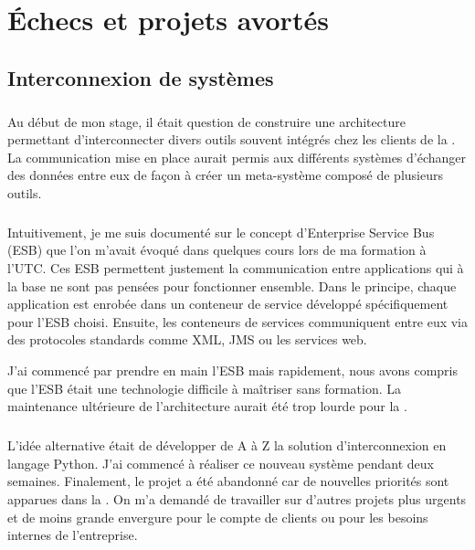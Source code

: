 \chapter{Échecs et projets avortés}
\label{section:avortes}

\section{Interconnexion de systèmes}

\paragraph{}
Au début de mon stage, il était question de construire une architecture permettant d'interconnecter divers outils souvent intégrés chez les clients de la \abusys.
La communication mise en place aurait permis aux différents systèmes d'échanger des données entre eux de façon à créer un \og meta-système \fg{} composé de plusieurs outils.

\paragraph{}
Intuitivement, je me suis documenté sur le concept d'Enterprise Service Bus (ESB) que l'on m'avait évoqué dans quelques cours lors de ma formation à l'UTC.
Ces ESB permettent justement la communication entre applications qui à la base ne sont pas pensées pour fonctionner ensemble.
Dans le principe, chaque application est enrobée dans un conteneur de service développé spécifiquement pour l'ESB choisi.
Ensuite, les conteneurs de services communiquent entre eux via des protocoles standards comme XML, JMS ou les services web.

J'ai commencé par prendre en main l'ESB \apetals{} mais rapidement, nous avons compris que l'ESB était une technologie difficile à maîtriser sans formation.
La maintenance ultérieure de l'architecture aurait été trop lourde pour la \abusys.

\paragraph{}
L'idée alternative était de développer de A à Z la solution d'interconnexion en langage Python.
J'ai commencé à réaliser ce nouveau système pendant deux semaines.
Finalement, le projet a été abandonné car de nouvelles priorités sont apparues dans la \abusys.
On m'a demandé de travailler sur d'autres projets plus urgents et de moins grande envergure pour le compte de clients ou pour les besoins internes de l'entreprise.



